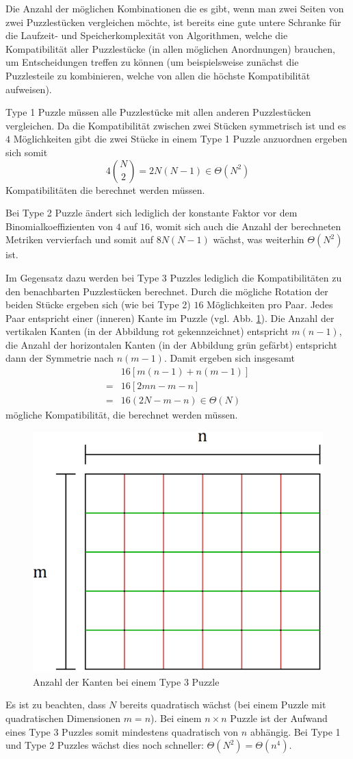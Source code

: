\documentclass{whswinvcbook}
\begin{document}
Die Anzahl der möglichen Kombinationen die es gibt, wenn man zwei Seiten von zwei Puzzlestücken vergleichen möchte, ist bereits eine gute untere Schranke für die Laufzeit- und Speicherkomplexität von Algorithmen, welche die Kompatibilität aller Puzzlestücke (in allen möglichen Anordnungen) brauchen, um Entscheidungen treffen zu können (um beispielsweise zunächst die Puzzlesteile zu kombinieren, welche von allen die höchste Kompatibilität aufweisen).

Type 1 Puzzle müssen alle Puzzlestücke mit allen anderen Puzzlestücken vergleichen. Da die Kompatibilität zwischen zwei Stücken symmetrisch ist und es $4$ Möglichkeiten gibt die zwei Stücke in einem Type 1 Puzzle anzuordnen ergeben sich somit $$4\binom{N}{2}=2N(N-1)\in\Theta(N^2)$$ Kompatibilitäten die berechnet werden müssen.

Bei Type 2 Puzzle ändert sich lediglich der konstante Faktor vor dem Binomialkoeffizienten von $4$ auf $16$, womit sich auch die Anzahl der berechneten Metriken vervierfach und somit auf $8N(N-1)$ wächst, was weiterhin $\Theta(N^2)$ ist.

Im Gegensatz dazu werden bei Type 3 Puzzles lediglich die Kompatibilitäten zu den benachbarten Puzzlestücken berechnet. Durch die mögliche Rotation der beiden Stücke ergeben sich (wie bei Type 2) $16$ Möglichkeiten pro Paar. Jedes Paar entspricht einer (inneren) Kante im Puzzle (vgl. Abb. \ref{fig-type3}). Die Anzahl der vertikalen Kanten (in der Abbildung rot gekennzeichnet) entspricht $m(n-1)$, die Anzahl der horizontalen Kanten (in der Abbildung grün gefärbt) entspricht dann der Symmetrie nach $n(m-1)$. Damit ergeben sich insgesamt
\begin{align*}
    &16[m(n-1)+n(m-1)]\\
    =&16[2mn-m-n]\\
    =&16(2N-m-n)\in\Theta(N)
\end{align*}
mögliche Kompatibilität, die berechnet werden müssen.
\begin{figure}[H]
    \centering
    \includegraphics[width=0.60\linewidth]{img/type3.png}
    \caption{Anzahl der Kanten bei einem Type 3 Puzzle}
    \label{fig-type3}
\end{figure}
Es ist zu beachten, dass $N$ bereits quadratisch wächst (bei einem Puzzle mit quadratischen Dimensionen $m=n$). Bei einem $n\times n$ Puzzle ist der Aufwand eines Type 3 Puzzles somit mindestens quadratisch von $n$ abhängig. Bei Type 1 und Type 2 Puzzles wächst dies noch schneller: $\Theta(N^2)=\Theta(n^4)$.
\end{document}
